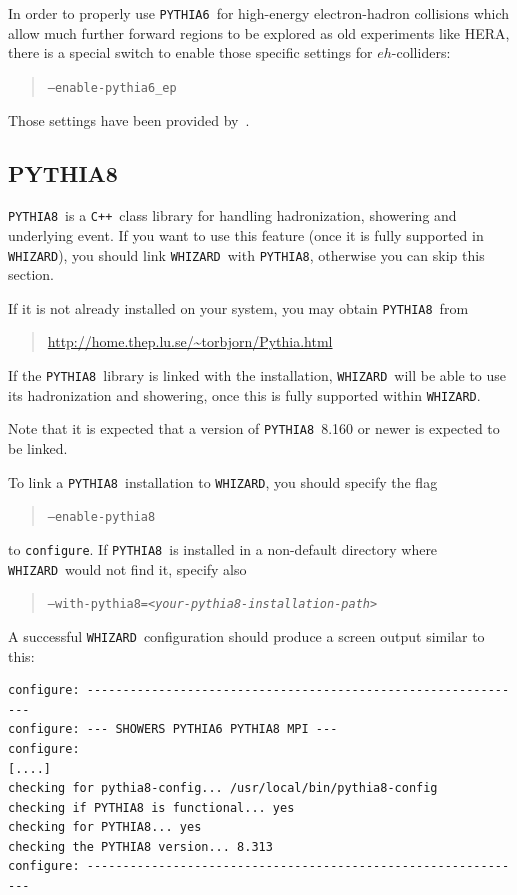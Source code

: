 \documentclass[12pt]{book}
\newcommand{\ttt}[1]{\texttt{#1}}
\newcommand{\whizard}{\ttt{WHIZARD}}
\newcommand{\pythiasix}{\ttt{PYTHIA6}}
\newcommand{\pythiaeight}{\ttt{PYTHIA8}}
\newcommand{\cpp}{\ttt{C++}}
\begin{document}
In order to properly use \pythiasix\ for high-energy electron-hadron
collisions which allow much further forward regions to be explored as
old experiments like HERA, there is a special switch to enable those
specific settings for $eh$-colliders:
\begin{quote}
  \ttt{--enable-pythia6\_ep}
\end{quote}
Those settings have been provided by~\cite{UtaKlein}.


\subsection{PYTHIA8}
\label{sec:pythia8}

\pythiaeight\ is a \cpp\ class library for handling hadronization,
showering and underlying event. If you want to use this feature (once it is
fully supported in \whizard), you should link \whizard\ with \pythiaeight,
otherwise you can skip this section.

If it is not already installed on your system, you may obtain
\pythiaeight\ from
\begin{quote}
  \url{http://home.thep.lu.se/~torbjorn/Pythia.html}
\end{quote}
If the \pythiaeight\ library is linked with the installation, \whizard\ will
be able to use its hadronization and showering, once this is fully supported
within \whizard.

Note that it is expected that a version of \pythiaeight\ 8.160 or
newer is expected to be linked.

To link a \pythiaeight\ installation to \whizard, you should specify the flag
\begin{quote}
\ttt{--enable-pythia8}
\end{quote}
to \ttt{configure}.  If  \pythiaeight\ is installed in a non-default directory
where \whizard\ would not find it, specify also
\begin{quote}
\ttt{--with-pythia8=\emph{<your-pythia8-installation-path>}}
\end{quote}

A successful \whizard\ configuration should produce a screen output
similar to this:
\begin{footnotesize}
\begin{verbatim}
configure: --------------------------------------------------------------
configure: --- SHOWERS PYTHIA6 PYTHIA8 MPI ---
configure:
[....]
checking for pythia8-config... /usr/local/bin/pythia8-config
checking if PYTHIA8 is functional... yes
checking for PYTHIA8... yes
checking the PYTHIA8 version... 8.313
configure: --------------------------------------------------------------
\end{verbatim}
\end{footnotesize}
\end{document}
